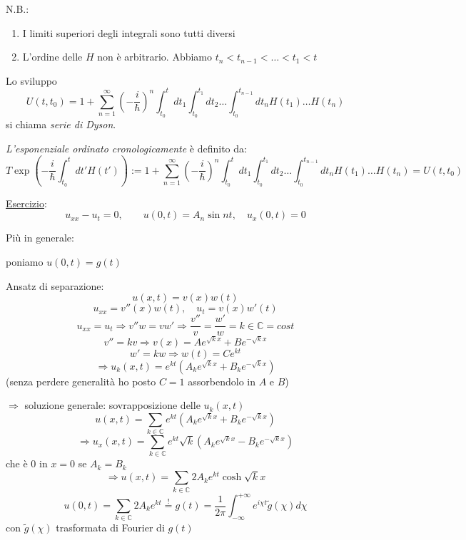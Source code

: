 \documentclass[a4paper,11pt]{report}
\begin{document}
N.B.:\begin{enumerate}
\item I limiti superiori degli integrali sono tutti diversi
\item L'ordine delle $H$ non \`e arbitrario. Abbiamo $t_n<t_{n-1}<\ldots <t_1<t$
\end{enumerate}
Lo sviluppo 
\begin{equation}
U(t,t_0)=1+\sum_{n=1}^\infty \left(-\frac{i}{\hbar}\right)^n \int_{t_0}^tdt_1 \int_{t_0}^{t_1}dt_2 \ldots \int_{t_0}^{t_{n-1}}dt_n H(t_1)\ldots H(t_n)
\end{equation}
si chiama \emph{serie di Dyson}.

\emph{L'esponenziale ordinato cronologicamente} \`e definito da:
\begin{equation}
T\exp\left(-\frac{i}{\hbar}\int_{t_0}^t dt' H(t')\right):=1+\sum_{n=1}^\infty \left(-\frac{i}{\hbar}\right)^n \int_{t_0}^tdt_1 \int_{t_0}^{t_1}dt_2 \ldots \int_{t_0}^{t_{n-1}}dt_n H(t_1)\ldots H(t_n) = U(t,t_0)
\label{2.178}
\end{equation}

\medskip

\underline{Esercizio}:
\[
u_{xx}-u_t =0, \qquad u(0,t)=A_n\sin nt ,\quad u_x(0,t)=0
\]

Pi\`u in generale: 

poniamo $u(0,t)=g(t)$

Ansatz di separazione:
\[
u(x,t)=v(x)w(t)
\]
\[
u_{xx}=v''(x)w(t), \quad u_t=v(x)w'(t)
\]
\[
u_{xx}=u_t \Rightarrow v'' w=vw' \Rightarrow \frac{v''}{v} = \frac{w'}{w} = k \in \mathbb{C} = cost
\]
\[
v''=kv \Rightarrow v(x)=Ae^{\sqrt{k}x} + B e^{-\sqrt{k} x}
\]
\[
w'=kw \Rightarrow w(t)=Ce^{kt}
\]
\[
\Rightarrow u_k(x,t)=e^{kt}\left(A_k e^{\sqrt{k} x}  + B_k e^{-\sqrt{k}x}\right)
\]
(senza perdere generalit\`a ho posto $C=1$ assorbendolo in $A$ e $B$)

$ \Rightarrow$ soluzione generale: sovrapposizione delle $u_k(x,t)$
\[
u(x,t)=\sum_{k\in \mathbb{C}} e^{kt}\left(A_k e^{\sqrt{k} x}  + B_k e^{-\sqrt{k}x}\right) 
\]
\[
\Rightarrow u_x(x,t)=\sum_{k\in \mathbb{C}} e^{kt}\sqrt{k}\left(A_k e^{\sqrt{k} x}  - B_k e^{-\sqrt{k}x}\right) 
\]
che \`e 0 in $x=0$ se $A_k = B_k$
\[
\Rightarrow u(x,t)=\sum_{k\in \mathbb{C}} 2A_ke^{kt}\cosh \sqrt{k}x
\]
\[
u(0,t)=\sum_{k\in \mathbb{C}} 2A_ke^{kt}\overset{!}{=}g(t)=\frac{1}{2\pi}\int_{-\infty}^{+\infty}e^{i\chi t} \tilde{g}(\chi)d\chi
\]
con $\tilde{g}(\chi)$ trasformata di Fourier di $g(t)$
\end{document}

